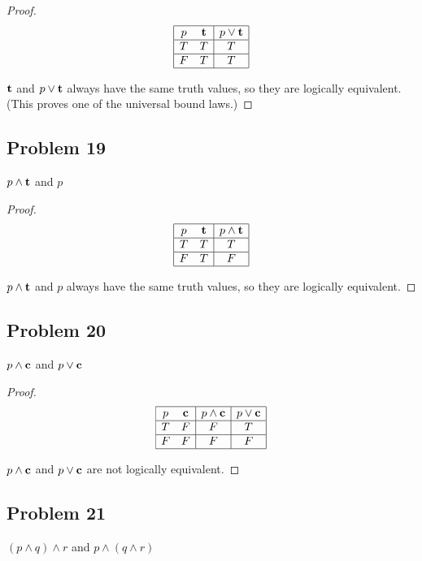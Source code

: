 \documentclass[14pt]{extarticle}
\newcommand{\true}{{\bf t}}
\newcommand{\false}{{\bf c}}
\begin{document}
\begin{proof}
$$
\begin{array}{|cc|c|}
\hline
p & \true & p \vee \true \\
\hline
T & T & T \\
\hline
F & T & T \\
\hline
\end{array}
$$

$\true$ and $p \vee \true$ always have the same truth values, so they are logically equivalent. (This proves one of the universal bound laws.)

\end{proof}

\subsection{Problem 19}
$p \wedge \true$ and $p$

\begin{proof}
$$
\begin{array}{|cc|c|}
\hline
p & \true & p \wedge \true \\
\hline
T & T & T \\
\hline
F & T & F \\
\hline
\end{array}
$$

$p \wedge \true$ and $p$ always have the same truth values, so they are logically equivalent.
\end{proof}

\subsection{Problem 20}
$p \wedge \false$ and $p \vee \false$

\begin{proof}
$$
\begin{array}{|cc|c|c|}
\hline
p & \false & p \wedge \false & p \vee \false \\
\hline
T & F & F & T \\
\hline
F & F & F & F \\
\hline
\end{array}
$$

$p \wedge \false$ and $p \vee \false$ are not logically equivalent.
\end{proof}

\subsection{Problem 21}
$(p \wedge q) \wedge r$ and $p \wedge (q \wedge r)$
\end{document}
